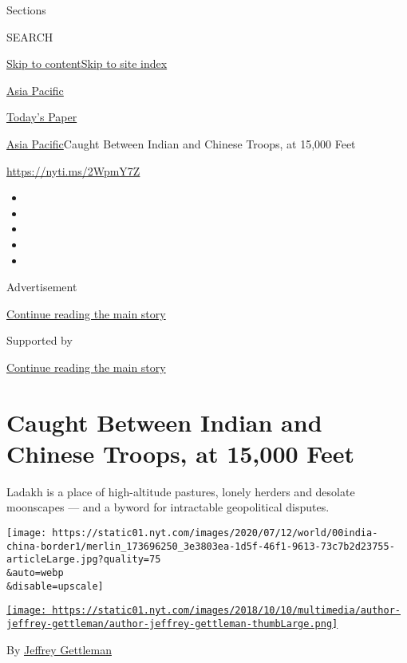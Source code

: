 Sections

SEARCH

\protect\hyperlink{site-content}{Skip to
content}\protect\hyperlink{site-index}{Skip to site index}

\href{https://www.nytimes.com/section/world/asia}{Asia Pacific}

\href{https://myaccount.nytimes.com/auth/login?response_type=cookie\&client_id=vi}{}

\href{https://www.nytimes.com/section/todayspaper}{Today's Paper}

\href{/section/world/asia}{Asia Pacific}\textbar{}Caught Between Indian
and Chinese Troops, at 15,000 Feet

\url{https://nyti.ms/2WpmY7Z}

\begin{itemize}
\item
\item
\item
\item
\item
\end{itemize}

Advertisement

\protect\hyperlink{after-top}{Continue reading the main story}

Supported by

\protect\hyperlink{after-sponsor}{Continue reading the main story}

\hypertarget{caught-between-indian-and-chinese-troops-at-15000-feet}{%
\section{Caught Between Indian and Chinese Troops, at 15,000
Feet}\label{caught-between-indian-and-chinese-troops-at-15000-feet}}

Ladakh is a place of high-altitude pastures, lonely herders and desolate
moonscapes --- and a byword for intractable geopolitical disputes.

\texttt{[image: https://static01.nyt.com/images/2020/07/12/world/00india-china-border1/merlin\_173696250\_3e3803ea-1d5f-46f1-9613-73c7b2d23755-articleLarge.jpg?quality=75\\\&auto=webp\\\&disable=upscale]}

\href{https://www.nytimes.com/by/jeffrey-gettleman}{\texttt{[image: https://static01.nyt.com/images/2018/10/10/multimedia/author-jeffrey-gettleman/author-jeffrey-gettleman-thumbLarge.png]}}

By \href{https://www.nytimes.com/by/jeffrey-gettleman}{Jeffrey
Gettleman}


